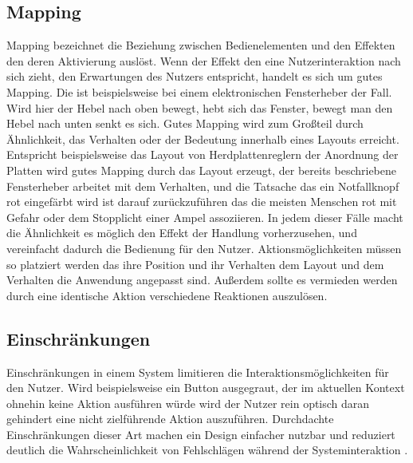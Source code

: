 \subsection*{Mapping}
Mapping bezeichnet die Beziehung zwischen Bedienelementen und den Effekten den deren Aktivierung auslöst.
Wenn der Effekt den eine Nutzerinteraktion nach sich zieht, den Erwartungen des Nutzers entspricht, handelt es sich um gutes Mapping.
Die ist beispielsweise bei einem elektronischen Fensterheber der Fall. Wird hier der Hebel nach oben bewegt, hebt sich das Fenster, bewegt man den Hebel nach unten senkt es sich.
Gutes Mapping wird zum Großteil durch Ähnlichkeit, das Verhalten oder der Bedeutung innerhalb eines Layouts erreicht.
Entspricht beispielsweise das Layout von Herdplattenreglern der Anordnung der Platten wird gutes Mapping durch das Layout erzeugt, der bereits beschriebene Fensterheber arbeitet mit dem Verhalten, und die Tatsache das ein Notfallknopf rot eingefärbt wird ist darauf zurückzuführen das die meisten Menschen rot mit Gefahr oder dem Stopplicht einer Ampel assoziieren.
In jedem dieser Fälle macht die Ähnlichkeit es möglich den Effekt der Handlung vorherzusehen, und vereinfacht dadurch die Bedienung für den Nutzer.
Aktionsmöglichkeiten müssen so platziert werden das ihre Position und ihr Verhalten dem Layout und dem Verhalten die Anwendung angepasst sind. 
Außerdem sollte es vermieden werden durch eine identische Aktion verschiedene Reaktionen auszulösen\cite{Lidwell.2010}.

\subsection*{Einschränkungen}
Einschränkungen in einem System limitieren die Interaktionsmöglichkeiten für den Nutzer.
Wird beispielsweise ein Button ausgegraut, der im aktuellen Kontext ohnehin keine Aktion ausführen würde wird der Nutzer rein optisch daran gehindert eine nicht zielführende Aktion auszuführen.
Durchdachte Einschränkungen dieser Art machen ein Design einfacher nutzbar und reduziert deutlich die Wahrscheinlichkeit von Fehlschlägen während der Systeminteraktion \cite{Lidwell.2010}.


